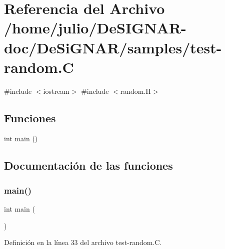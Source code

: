 \hypertarget{test-random_8_c}{}\section{Referencia del Archivo /home/julio/\+De\+S\+I\+G\+N\+A\+R-\/doc/\+De\+Si\+G\+N\+A\+R/samples/test-\/random.C}
\label{test-random_8_c}
{\ttfamily \#include $<$iostream$>$}\newline
{\ttfamily \#include $<$random.\+H$>$}\newline
\subsection*{Funciones}
\begin{DoxyCompactItemize}
\item 
int \hyperlink{test-random_8_c_ae66f6b31b5ad750f1fe042a706a4e3d4}{main} ()
\end{DoxyCompactItemize}


\subsection{Documentación de las funciones}
\mbox{\label{test-random_8_c_ae66f6b31b5ad750f1fe042a706a4e3d4}} 
\subsubsection{\texorpdfstring{main()}{main()}}
{\footnotesize\ttfamily int main (\begin{DoxyParamCaption}{ }\end{DoxyParamCaption})}



Definición en la línea 33 del archivo test-\/random.\+C.

